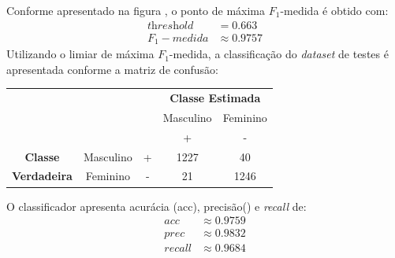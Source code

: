 \documentclass{article}
\begin{document}
    Conforme apresentado na figura , o ponto de máxima $F_1$-medida é
    obtido com:
    \begin{align*}
        \textit{threshold}&=0.663 \\
        F_1-medida&\approx0.9757
    \end{align*}
    Utilizando o limiar de máxima $F_1$-medida, a classificação do \textit{dataset} de testes é 
    apresentada conforme a matriz de confusão:
    \begin{table}[H]
        \begin{tabular}{ccccc}
        &  &  & \multicolumn{2}{c}{\textbf{Classe Estimada}} \\
        &  &  & Masculino & Feminino \\
        &  &  & + & - \\ \cline{4-5} 
        \textbf{Classe} & Masculino & \multicolumn{1}{c|}{+} & \multicolumn{1}{c|}{1227} & \multicolumn{1}{c|}{40} \\ \cline{4-5} 
        \textbf{Verdadeira} & Feminino & \multicolumn{1}{c|}{-} & \multicolumn{1}{c|}{21} & \multicolumn{1}{c|}{1246} \\ \cline{4-5} 
        \end{tabular}
    \end{table}
    O classificador apresenta acurácia (acc), precisão() e \textit{recall} de:
    \begin{align*}
        acc & \approx0.9759 \\
        prec & \approx0.9832 \\
        recall & \approx0.9684
    \end{align*}
\end{document}
